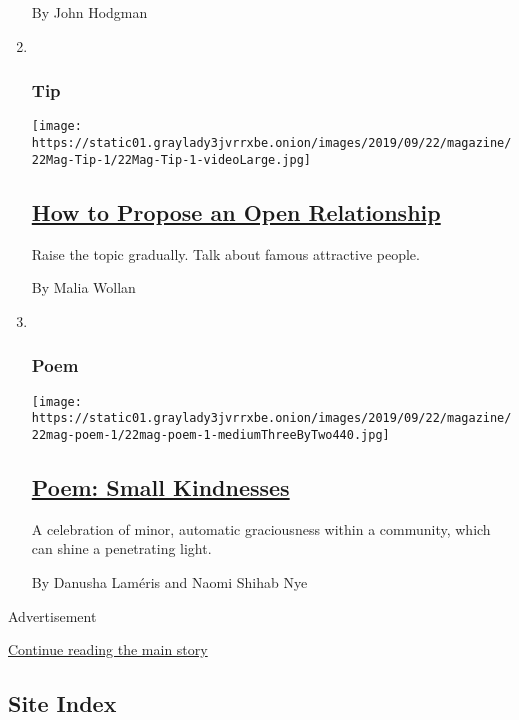 \begin{enumerate}
  By John Hodgman
\item ~
  \hypertarget{tip}{%
  \subsubsection{Tip}\label{tip}}

  \texttt{[image: https://static01.graylady3jvrrxbe.onion/images/2019/09/22/magazine/22Mag-Tip-1/22Mag-Tip-1-videoLarge.jpg]}

  \hypertarget{how-to-propose-an-open-relationship}{%
  \subsection{\texorpdfstring{\href{/2019/09/18/magazine/how-to-propose-an-open-relationship.html}{How
  to Propose an Open
  Relationship}}{How to Propose an Open Relationship}}\label{how-to-propose-an-open-relationship}}

  Raise the topic gradually. Talk about famous attractive people.

  By Malia Wollan
\item ~
  \hypertarget{poem}{%
  \subsubsection{Poem}\label{poem}}

  \texttt{[image: https://static01.graylady3jvrrxbe.onion/images/2019/09/22/magazine/22mag-poem-1/22mag-poem-1-mediumThreeByTwo440.jpg]}

  \hypertarget{poem-small-kindnesses}{%
  \subsection{\texorpdfstring{\href{/2019/09/19/magazine/poem-small-kindnesses.html}{Poem:
  Small
  Kindnesses}}{Poem: Small Kindnesses}}\label{poem-small-kindnesses}}

  A celebration of minor, automatic graciousness within a community,
  which can shine a penetrating light.

  By Danusha Laméris and Naomi Shihab Nye
\end{enumerate}

Advertisement

\protect\hyperlink{after-mid1}{Continue reading the main story}

\hypertarget{site-index}{%
\subsection{Site Index}\label{site-index}}

